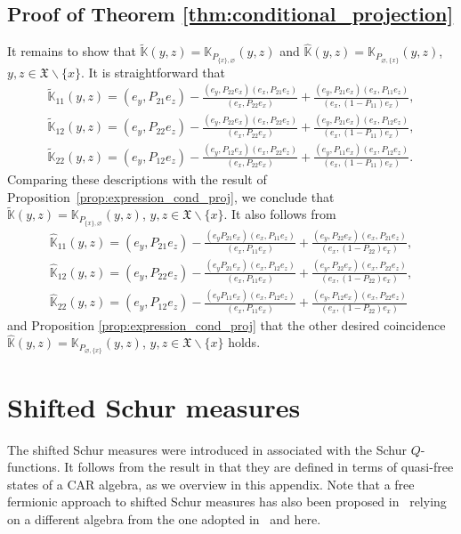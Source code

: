 \documentclass[pdftex]{sigma}
\numberwithin{equation}{section}
\newcommand{\mfrak}[1]{\mathfrak{#1}}
\newcommand{\mbb}[1]{\mathbb{#1}}
\newcommand{\what}[1]{\widehat{#1}}
\begin{document}
\subsection{Proof of Theorem \ref{thm:conditional_projection}}
It remains to show that $\widetilde{\mbb{K}}(y,z)=\mbb{K}_{P_{\{x\},\varnothing}}(y,z)$ and $\what{\mbb{K}}(y,z)=\mbb{K}_{P_{\varnothing,\{x\}}}(y,z)$, $y,z\in \mfrak{X}\backslash\{x\}$.
It is straightforward that
\begin{gather*}
\widetilde{\mbb{K}}_{11}(y,z)=(e_{y},P_{21}e_{z})-\frac{(e_{y},P_{22}e_{x})(e_{x},P_{21}e_{z})}{(e_{x},P_{22}e_{x})}+\frac{(e_{y},P_{21}e_{x})(e_{x},P_{11}e_{z})}{(e_{x},(1-P_{11})e_{x})}, \\
\widetilde{\mbb{K}}_{12}(y,z)=(e_{y},P_{22}e_{z})-\frac{(e_{y},P_{22}e_{x})(e_{x},P_{22}e_{z})}{(e_{x},P_{22}e_{x})}+\frac{(e_{y},P_{21}e_{x})(e_{x},P_{12}e_{z})}{(e_{x},(1-P_{11})e_{x})}, \\
\widetilde{\mbb{K}}_{22}(y,z)=(e_{y},P_{12}e_{z})-\frac{(e_{y},P_{12}e_{x})(e_{x},P_{22}e_{z})}{(e_{x},P_{22}e_{x})}+\frac{(e_{y},P_{11}e_{x})(e_{x},P_{12}e_{z})}{(e_{x},(1-P_{11})e_{x})}.
\end{gather*}
Comparing these descriptions with the result of Proposition~\ref{prop:expression_cond_proj}, we conclude that $\widetilde{\mbb{K}}(y,z)=\mbb{K}_{P_{\{x\},\varnothing}}(y,z)$, $y,z\in\mfrak{X}\backslash\{x\}$.
It also follows from
\begin{gather*}
\what{\mbb{K}}_{11}(y,z)=(e_{y},P_{21}e_{z})-\frac{(e_{y}P_{21}e_{x})(e_{x},P_{11}e_{z})}{(e_{x},P_{11}e_{x})}+\frac{(e_{y},P_{22}e_{x})(e_{x},P_{21}e_{z})}{(e_{x},(1-P_{22})e_{x})}, \\
\what{\mbb{K}}_{12}(y,z)=(e_{y},P_{22}e_{z})-\frac{(e_{y}P_{21}e_{x})(e_{x},P_{12}e_{z})}{(e_{x},P_{11}e_{x})}+\frac{(e_{y},P_{22}e_{x})(e_{x},P_{22}e_{z})}{(e_{x},(1-P_{22})e_{x})}, \\
\what{\mbb{K}}_{22}(y,z)=(e_{y},P_{12}e_{z})-\frac{(e_{y}P_{11}e_{x})(e_{x},P_{12}e_{z})}{(e_{x},P_{11}e_{x})}+\frac{(e_{y},P_{12}e_{x})(e_{x},P_{22}e_{z})}{(e_{x},(1-P_{22})e_{x})}
\end{gather*}
and Proposition \ref{prop:expression_cond_proj} that the other desired coincidence $\what{\mbb{K}}(y,z)=\mbb{K}_{P_{\varnothing,\{x\}}}(y,z)$, $y,z\in \mfrak{X}\backslash\{x\}$ holds.

\appendix

\section{Shifted Schur measures}\label{sect:shifed_Schur_measures}
The shifted Schur measures were introduced in \cite{TracyWidom2004} associated with the Schur $Q$-functions. It follows from the result in \cite{Matsumoto2005} that they are defined in terms of quasi-free states of a CAR algebra, as we overview in this appendix. Note that a free fermionic approach to shifted Schur measures has also been proposed in~\cite{WangLi2019} relying on a different algebra from the one adopted in~\cite{Matsumoto2005} and here.
\end{document}
